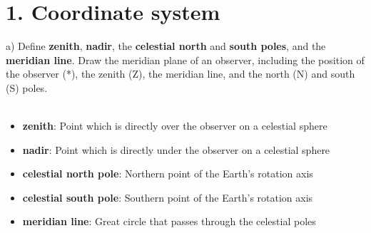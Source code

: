 \section*{1. Coordinate system}

a) Define \textbf{zenith}, \textbf{nadir}, the \textbf{celestial north} and \textbf{south poles}, and the
\textbf{meridian line}. Draw the meridian plane of an observer, including the position of the observer 
(*), the zenith (Z), the meridian line, and the north (N) and south (S) poles.\\
\\
\begin{itemize}
    \item \textbf{zenith}: Point which is directly over the observer on a celestial sphere
    \item \textbf{nadir}: Point which is directly under the observer on a celestial sphere
    \item \textbf{celestial north pole}: Northern point of the Earth's rotation axis
    \item \textbf{celestial south pole}: Southern point of the Earth's rotation axis
    \item \textbf{meridian line}: Great circle that passes through the celestial poles
\end{itemize}

